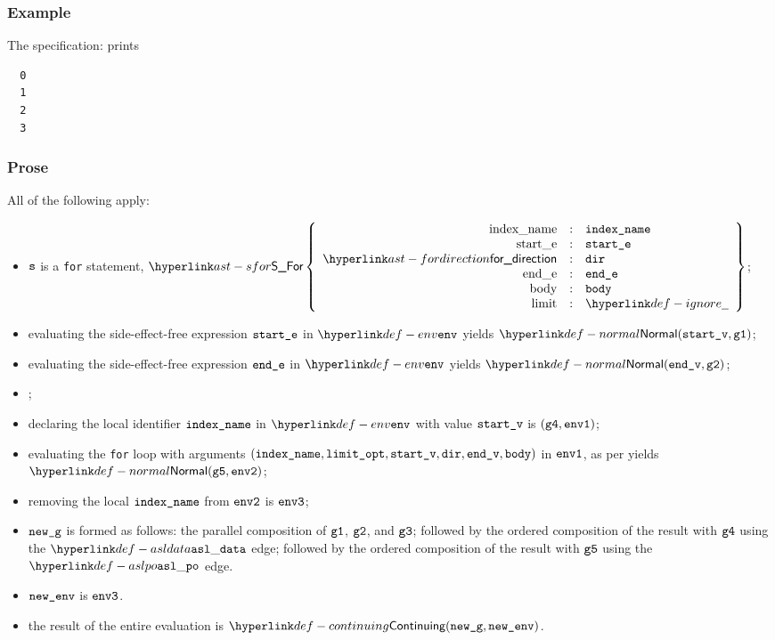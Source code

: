 \subsubsection{Example}
The specification:
prints
\begin{Verbatim}
  0
  1
  2
  3
\end{Verbatim}

\subsubsection{Prose}
All of the following apply:
\begin{itemize}
  \item $\texttt{s}$ is a \texttt{for} statement, $\SFor\left\{\begin{array}{rcl}
    \Forindexname &:& \vindexname\\
    \Forstarte &:& \vstarte\\
    \fordirection &:& \vdir\\
    \Forende &:& \vende\\
    \Forbody &:& \vbody\\
    \Forlimit &:& \Ignore
  \end{array}\right\}$;
  \item evaluating the side-effect-free expression $\texttt{start\_e}$ in $\env$ yields
        $\Normal(\vstartv, \vgone)$\ProseOrError;
  \item evaluating the side-effect-free expression $\texttt{end\_e}$ in $\env$ yields
        $\Normal(\vendv, \vgtwo)$\ProseOrError;
  \item \Proseevallimit{$\env$}{$\velimitopt$}{$\Normal(\vlimitopt, \vgthree)$}\ProseOrError;
  \item declaring the local identifier $\texttt{index\_name}$ in $\env$ with value $\texttt{start\_v}$ is $(\texttt{g4}, \texttt{env1})$;
  \item evaluating the \texttt{for} loop with arguments $(\texttt{index\_name}, \texttt{limit\_opt}, \texttt{start\_v}, \texttt{dir}, \texttt{end\_v}, \texttt{body})$ in $\texttt{env1}$,
        as per  yields $\Normal(\vgfive, \envtwo)$\ProseOrAbnormal;
  \item removing the local $\texttt{index\_name}$ from $\texttt{env2}$ is $\texttt{env3}$;
  \item $\texttt{new\_g}$ is formed as follows:
        the parallel composition of $\texttt{g1}$, $\texttt{g2}$, and $\texttt{g3}$;
        followed by the ordered composition of the result with $\texttt{g4}$ using the $\asldata$ edge;
        followed by the ordered composition of the result with $\texttt{g5}$ using the $\aslpo$ edge.
  \item $\texttt{new\_env}$ is $\texttt{env3}$.
  \item the result of the entire evaluation is $\Continuing(\newg, \newenv)$.
\end{itemize}
